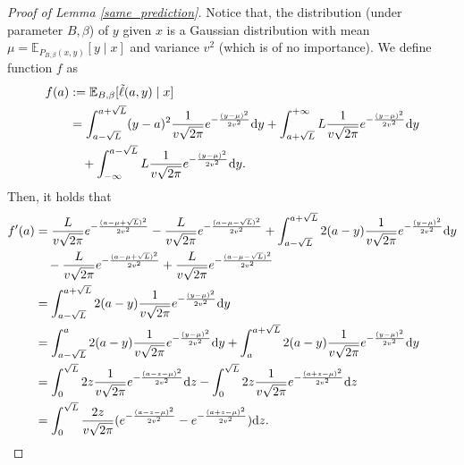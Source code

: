 \begin{proof}[Proof of Lemma \ref{same_prediction}]
Notice that, the distribution (under parameter $B,\beta$) of $y$ given $x$ is a Gaussian distribution with mean $\mu=\mathbb{E}_{P_{B, \beta}(x, y)}[y \mid x]$ and variance $v^{2}$ (which is of no importance). We define function $f$ as
\begin{align}
f(a )&:=\mathbb{E}_{B,\beta}[\tilde{\ell}(a,y) \mid x]\notag \\
&=  \int_{a-\sqrt{L}}^{a+\sqrt{L}}(y-a)^{2}  \frac{1}{v\sqrt{2 \pi}}e^{-\frac{(y-\mu)^{2}}{2v^{2}}}\mathrm{d}y +  \int_{a+\sqrt{L}}^{+\infty} L \frac{1}{v\sqrt{2 \pi}}e^{-\frac{(y-\mu)^{2}}{2v^{2}}}\mathrm{d}y \notag\\
&\quad+ \int_{-\infty}^{a-\sqrt{L}} L \frac{1}{v\sqrt{2 \pi}}e^{-\frac{(y-\mu)^{2}}{2v^{2}}}\mathrm{d}y.
\end{align}
Then, it holds that
\begin{align}
f'(a)&=\frac{L}{v\sqrt{2\pi}}e^{-\frac{(a-\mu+\sqrt{L})^{2}}{2v^{2}}} - \frac{L}{v\sqrt{2\pi}}e^{-\frac{(a-\mu-\sqrt{L})^{2}}{2v^{2}}} + \int_{a-\sqrt{L}}^{a+\sqrt{L}}2(a-y)\frac{1}{v\sqrt{2 \pi}}e^{-\frac{(y-\mu)^{2}}{2v^{2}}}\mathrm{d}y \notag \\
&\quad - \frac{L}{v\sqrt{2\pi}}e^{-\frac{(a-\mu+\sqrt{L})^{2}}{2v^{2}}} + \frac{L}{v\sqrt{2\pi}}e^{-\frac{(a-\mu-\sqrt{L})^{2}}{2v^{2}}} \notag \\
& = \int_{a-\sqrt{L}}^{a+\sqrt{L}}2(a-y)\frac{1}{v\sqrt{2 \pi}}e^{-\frac{(y-\mu)^{2}}{2v^{2}}}\mathrm{d}y \notag \\
&= \int_{a-\sqrt{L}}^{a}2(a-y)\frac{1}{v\sqrt{2 \pi}}e^{-\frac{(y-\mu)^{2}}{2v^{2}}}\mathrm{d}y + \int_{a}^{a+\sqrt{L}}2(a-y)\frac{1}{v\sqrt{2 \pi}}e^{-\frac{(y-\mu)^{2}}{2v^{2}}}\mathrm{d}y \notag \\
&= \int_{0}^{\sqrt{L}}2z \frac{1}{v\sqrt{2 \pi}}e^{-\frac{(a-z-\mu)^{2}}{2v^{2}}}\mathrm{d}z - \int_{0}^{\sqrt{L}}2z \frac{1}{v\sqrt{2 \pi}}e^{-\frac{(a+z-\mu)^{2}}{2v^{2}}}\mathrm{d}z \notag \\
&= \int_{0}^{\sqrt{L}} \frac{2z}{v\sqrt{2 \pi}}(e^{-\frac{(a-z-\mu)^{2}}{2v^{2}}}-e^{-\frac{(a+z-\mu)^{2}}{2v^{2}}}) \mathrm{d}z.

\end{align}
\end{proof}
